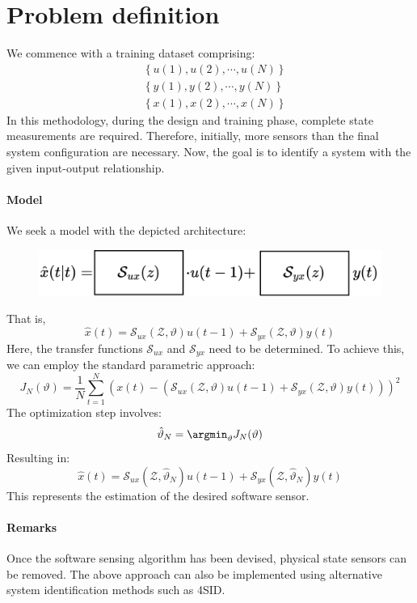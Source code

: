 \section{Problem definition}

We commence with a training dataset comprising:
\begin{align*}
    &\left\{u(1),u(2),\cdots,u(N)\right\} \\
    &\left\{y(1),y(2),\cdots,y(N)\right\} \\
    &\left\{x(1),x(2),\cdots,x(N)\right\}
\end{align*}
In this methodology, during the design and training phase, complete state measurements are required. 
Therefore, initially, more sensors than the final system configuration are necessary.
Now, the goal is to identify a system with the given input-output relationship.

\paragraph*{Model}
We seek a model with the depicted architecture:
\begin{figure}[H]
    \centering
    \includegraphics[width=0.75\linewidth]{images/arch.png}
\end{figure}
That is,
\[\hat{x}(t)=\mathcal{S}_{ux}(\mathcal{Z},\vartheta)u(t-1)+\mathcal{S}_{yx}(\mathcal{Z},\vartheta)y(t)\]
Here, the transfer functions $\mathcal{S}_{ux}$ and $\mathcal{S}_{yx}$ need to be determined.
To achieve this, we can employ the standard parametric approach:
\[J_N(\vartheta)=\dfrac{1}{N}\sum_{t=1}^{N}\left(x(t)-\left(\mathcal{S}_{ux}(\mathcal{Z},\vartheta)u(t-1)+\mathcal{S}_{yx}(\mathcal{Z},\vartheta)y(t)\right)\right)^2\]
The optimization step involves:
\[\hat{\vartheta}_N=\argmin_{\vartheta}J_N(\vartheta)\]
Resulting in:
\[\hat{x}(t)=\mathcal{S}_{ux}(\mathcal{Z},\hat{\vartheta}_N)u(t-1)+\mathcal{S}_{yx}(\mathcal{Z},\hat{\vartheta}_N)y(t)\]
This represents the estimation of the desired software sensor.

\paragraph*{Remarks}
Once the software sensing algorithm has been devised, physical state sensors can be removed.
The above approach can also be implemented using alternative system identification methods such as 4SID.